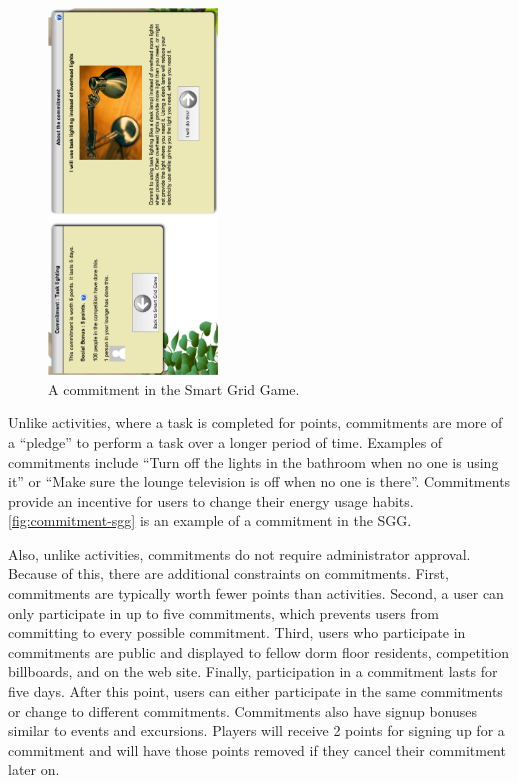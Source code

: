 \begin{figure}[h]
  \center
  \includegraphics[width=0.4\textwidth,angle=270]{images/commitment.eps}
  \caption{A commitment in the Smart Grid Game.}
  \label{fig:commitment-sgg}
\end{figure}

Unlike activities, where a task is completed for points, commitments are more of a ``pledge'' to perform a task over a longer period of time.  Examples of commitments include ``Turn off the lights in the bathroom when no one is using it'' or ``Make sure the lounge television is off when no one is there''.  Commitments provide an incentive for users to change their energy usage habits. \autoref{fig:commitment-sgg} is an example of a commitment in the SGG.

Also, unlike activities, commitments do not require administrator approval.  Because of this, there are additional constraints on commitments.  First, commitments are typically worth fewer points than activities.  Second, a user can only participate in up to five commitments, which prevents users from committing to every possible commitment.  Third, users who participate in commitments are public and displayed to fellow dorm floor residents, competition billboards, and on the web site.  Finally, participation in a commitment lasts for five days.  After this point, users can either participate in the same commitments or change to different commitments.  Commitments also have signup bonuses similar to events and excursions.  Players will receive 2 points for signing up for a commitment and will have those points removed if they cancel their commitment later on.

